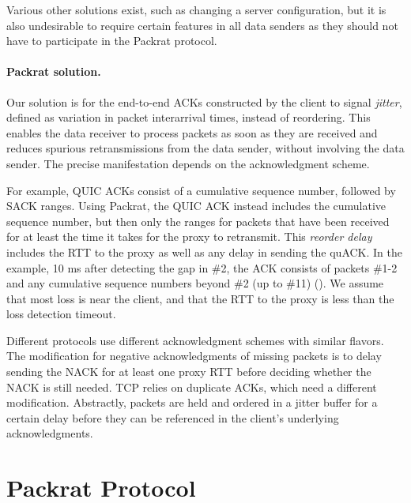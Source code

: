 Various other solutions exist, such as changing a server configuration, but it
is also undesirable to require certain features in all data senders as they
should not have to participate in the Packrat protocol.

\paragraph{Packrat solution.}

Our solution is for the end-to-end ACKs constructed by the client to
signal \textit{jitter}, defined as variation in packet interarrival times,
instead of reordering. This enables the data receiver to process packets as
soon as they are received and reduces spurious retransmissions from the data
sender, without involving the data sender. The precise manifestation depends on
the acknowledgment scheme.

For example, QUIC ACKs consist of a cumulative sequence number, followed by SACK
ranges. Using Packrat, the QUIC ACK instead includes the cumulative sequence
number, but then only the ranges for packets that have been received for at
least the time it takes for the proxy to retransmit. This
\textit{reorder delay} includes the RTT to the proxy
as well as any delay in sending the quACK.
In the example, 10 ms after detecting the gap in \#2, the ACK consists
of packets \#1-2 and any cumulative sequence numbers beyond \#2 (up to \#11)
().
We assume
that most loss is near the client, and that the RTT to the proxy is less than
the loss detection timeout.

Different protocols use different acknowledgment schemes with similar flavors.
The modification for negative acknowledgments of missing packets is to delay
sending the NACK for at least one proxy RTT before deciding whether the NACK is
still needed. TCP relies on duplicate ACKs, which need a different
modification. Abstractly, packets are held and ordered in a jitter buffer for a
certain delay before they can be referenced in the client's underlying
acknowledgments.

\section{Packrat Protocol}
\label{sec:packrat:protocol}

